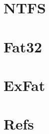 



\def \CompanyName   {ComputerTeknologi} %
\def \overskrift    {Filsystemer}          %
\def \companyName   {\CompanyName}




	\author{Johannes H. T. Johansen}
	\begin{center}
		\vspace*{25mm}
		\thispagestyle{SYNACKSALEFOOTER_DK}
	\end{center}

\begin{comment}
\rowcolors{2}{gray!15}{white}
\section{Address}
	\begin{tabular}{|ll|} \hline
		Company name:		& \companyName					\\
		Address:			& <++>							\\
		Postnr.:			& <++>							\\
		Phone:				& +298 <++>						\\ 
		E-Mail:             & <++>							\\ \hline
	\end{tabular}
\end{comment}

\section{NTFS}


\section{Fat32}


\section{ExFat}


\section{Refs}


%

%

%
%



